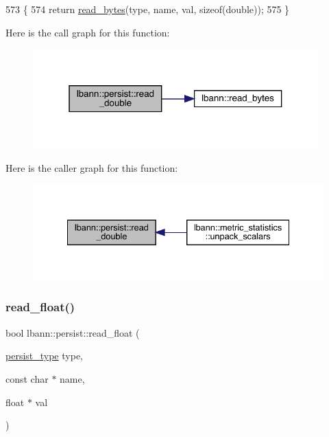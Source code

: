 \begin{DoxyCode}
573                                                                                \{
574   \textcolor{keywordflow}{return} \hyperlink{classlbann_1_1persist_af24f635f634c8cf30cf53a0e90ec641b}{read\_bytes}(type, name, val, \textcolor{keyword}{sizeof}(\textcolor{keywordtype}{double}));
575 \}
\end{DoxyCode}
Here is the call graph for this function\+:\nopagebreak
\begin{figure}[H]
\begin{center}
\leavevmode
\includegraphics[width=313pt]{classlbann_1_1persist_ae3a0b96ece72901bb0a05d26a4eb4791_cgraph}
\end{center}
\end{figure}
Here is the caller graph for this function\+:\nopagebreak
\begin{figure}[H]
\begin{center}
\leavevmode
\includegraphics[width=334pt]{classlbann_1_1persist_ae3a0b96ece72901bb0a05d26a4eb4791_icgraph}
\end{center}
\end{figure}
\mbox{\label{classlbann_1_1persist_ac5e659a6612e5f2911e195fc1b6c045b}} 
\subsubsection{\texorpdfstring{read\+\_\+float()}{read\_float()}}
{\footnotesize\ttfamily bool lbann\+::persist\+::read\+\_\+float (\begin{DoxyParamCaption}\item[{\hyperlink{namespacelbann_adee41f31f15f3906cbdcce4a1417eb56}{persist\+\_\+type}}]{type,  }\item[{const char $\ast$}]{name,  }\item[{float $\ast$}]{val }\end{DoxyParamCaption})}



